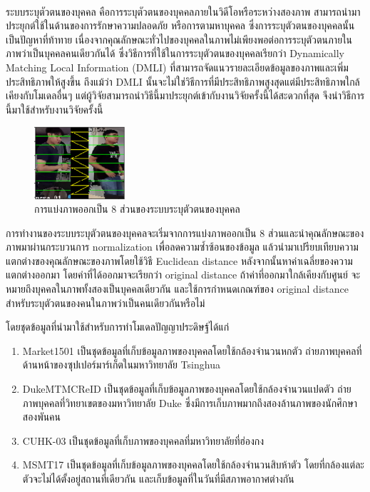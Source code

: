 ระบบระบุตัวตนของบุคคล\textsuperscript{\cite{luo2019alignedreid++}}\textsuperscript{\cite{zhang2017alignedreid}} คือการระบุตัวตนของบุคคลภายในวิดีโอหรือระหว่างสองภาพ สามารถนำมาประยุกต์ใช้ในด้านของการรักษาความปลอดภัย 
หรือการตามหาบุคคล ซึ่งการระบุตัวตนของบุคคลนั้นเป็นปัญหาที่ท้าทาย เนื่องจากคุณลักษณะทั่วไปของบุคคลในภาพไม่เพียงพอต่อการระบุตัวตนภายในภาพว่าเป็นบุคคลคนเดียวกันได้ ซึ่งวิธีการที่ใช้ในการระบุตัวตนของบุคคลเรียกว่า 
Dynamically Matching Local Information (DMLI) ที่สามารถจัดแนวรายละเอียดข้อมูลของภาพและเพิ่มประสิทธิภาพให้สูงขึ้น 
ถึงแม้ว่า DMLI นั้นจะไม่ใช่วิธีการที่มีประสิทธิภาพสูงสุดแต่มีประสิทธิภาพใกล้เคียงกับโมเดลอื่นๆ แต่ผู้วิจัยสามารถนำวิธีนี้มาประยุกต์เข้ากับงานวิจัยครั้งนี้ได้สะดวกที่สุด จึงนำวิธีการนี้มาใช้สำหรับงานวิจัยครั้งนี้

\begin{figure}[!ht]
	\centering
	\includegraphics[width=0.3\textwidth]{chapter2/images/alignedreid.png}
		\caption{การแบ่งภาพออกเป็น 8 ส่วนของระบบระบุตัวตนของบุคคล}
    	\label{fig:alignedreid}
\end{figure}
\clearpage
การทำงานของระบบระบุตัวตนของบุคคลจะเริ่มจากการแบ่งภาพออกเป็น 8 ส่วนและนำคุณลักษณะของภาพมาผ่านกระบวนการ normalization เพื่อลดความซ้ำซ้อนของข้อมูล 
แล้วนำมาเปรียบเทียบความแตกต่างของคุณลักษณะของภาพโดยใช้วิธี Euclidean distance หลังจากนั้นหาค่าเฉลี่ยของความแตกต่างออกมา โดยค่าที่ได้ออกมาจะเรียกว่า original distance ถ้าค่าที่ออกมาใกล้เคียงกับศูนย์
จะหมายถึงบุคคลในภาพทั้งสองเป็นบุคคลเดียวกัน และใช้การกำหนดเกณฑ์ของ original distance สำหรับระบุตัวตนของคนในภาพว่าเป็นคนเดียวกันหรือไม่

โดยชุดข้อมูลที่นำมาใช้สำหรับการทำโมเดลปัญญาประดิษฐ์ได้แก่
\begin{enumerate}
	\item{Market1501 เป็นชุดข้อมูลที่เก็บข้อมูลภาพของบุคคลโดยใช้กล้องจำนวนหกตัว ถ่ายภาพบุคคลที่ด้านหน้าของซุปเปอร์มาร์เก็ตในมหาวิทยาลัย Tsinghua}
	\item{DukeMTMCReID เป็นชุดข้อมูลที่เก็บข้อมูลภาพของบุคคลโดยใช้กล้องจำนวนแปดตัว ถ่ายภาพบุคคลที่วิทยาเขตของมหาวิทยาลัย Duke ซึ่งมีการเก็บภาพมากถึงสองล้านภาพของนักศึกษาสองพันคน }
	\item{CUHK-03 เป็นชุดข้อมูลที่เก็บภาพของบุคคลที่มหาวิทยาลัยที่ฮ่องกง}
	\item{MSMT17 เป็นชุดข้อมูลที่เก็บข้อมูลภาพของบุคคลโดยใช้กล้องจำนวนสิบห้าตัว โดยที่กล้องแต่ละตัวจะไม่ได้ตั้งอยู่สถานที่เดียวกัน และเก็บข้อมูลที่ในวันที่มีสภาพอากาศต่างกัน}
\end{enumerate}

